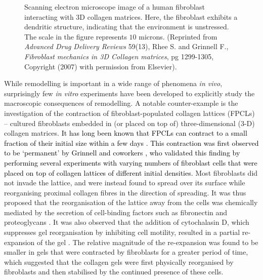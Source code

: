 \begin{figure}[t]
\caption{Scanning electron microscope image of a human fibroblast interacting with 3D collagen matrices. Here, the fibroblast exhibits a dendritic structure, indicating that the environment is unstressed. The scale in the figure represents $10$ microns. (Reprinted from \emph{Advanced Drug Delivery Reviews} 59(13), Rhee S. and Grinnell F., \textit{Fibroblast mechanics in 3D Collagen matrices}, pg 1299-1305, Copyright (2007) with permission from Elsevier).}
\label{fig:SEM}
\end{figure}
While remodelling is important in a wide range of phenomena \emph{in vivo}, surprisingly few \emph{in vitro} experiments have been developed to explicitly study the macroscopic consequences of remodelling. A notable counter-example is the investigation of the contraction of fibroblast-populated collagen lattices (FPCLs) -- cultured fibroblasts embedded in (or placed on top of) three-dimensional ($3$-D) collagen matrices. \textcolor{black}{It has long been known that FPCLs can contract to a small fraction of their initial size within a few days \citep{Bell1979}. This contraction was first observed to be `permanent'  by Grinnell and coworkers  \citep{Grinnell1984,Guidry1985,Guidry1986}, who validated this finding by performing several experiments with varying numbers of fibroblast cells that were placed on top of collagen lattices of different initial densities.} Most fibroblasts did not invade the lattice, and were instead found to spread over its surface while reorganising proximal collagen fibres in the direction of spreading. It was thus proposed that the reorganisation of the lattice away from the cells was chemically mediated by the secretion of cell-binding factors such as fibronectin and proteoglycans \citep{Grinnell1984}. It was also observed that the addition of cytochalasin D, which suppresses gel reorganisation by inhibiting cell motility, resulted in a partial re-expansion of the gel \citep{Guidry1985,Guidry1986}. The relative magnitude of the re-expansion was found to be smaller in gels that were contracted by fibroblasts for a greater period of time, which suggested that the collagen gels were first physically reorganised by fibroblasts and then stabilised by the continued presence of these cells.


